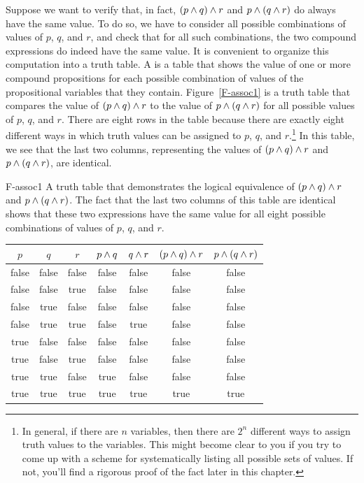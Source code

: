 Suppose we want to verify that, in fact, $(p\wedge q)\wedge r$ and
$p\wedge (q\wedge r)$ do always have the same value.  To do so,
we have to consider all possible combinations of values
of $p$, $q$, and $r$, and check that for all such combinations,
the two compound expressions do indeed have the same value.
It is convenient to organize this computation into a
truth table.  A  is a table that shows the
value of one or more compound propositions for each possible
combination of values of the propositional variables that they contain.
Figure~\ref{F-assoc1} is a truth table that compares the
value of $(p\wedge q)\wedge r$ to the value of $p\wedge (q\wedge r)$
for all possible values of $p$, $q$, and $r$.  There are
eight rows in the table because there are exactly eight different
ways in which truth values can be assigned to $p$, $q$, and
$r$.\footnote{In general, if there are $n$ variables, then
there are $2^n$ different ways to assign truth values to the
variables.  This might become clear to you if you try to come
up with a scheme for systematically listing all possible sets
of values.  If not, you'll find a rigorous proof of the fact 
later in this chapter.}  In this table, we see that the last
two columns, representing the values of
$(p\wedge q)\wedge r$ and $p\wedge (q\wedge r)$, are
identical.

\fig
  {F-assoc1}
  {A truth table that demonstrates the logical equivalence of
      $(p\wedge q)\wedge r$ and $p\wedge(q\wedge r)$.  The fact that the
      last two columns of this table are identical shows that
      these two expressions have the same value for all eight
      possible combinations of values of $p$, $q$, and $r$.}
  {\begin{tabular}{|c|c|c||c|c|c|c|}
        \hline
        $p$& $q$& $r$&
           $p\wedge q$& $q\wedge r$&
           $(p\wedge q)\wedge r$& $p\wedge (q\wedge r)$\\
        \hline
        \strut false& false& false& false& false& false& false\\
        false& false& true&  false& false& false& false\\
        false& true&  false& false& false& false& false\\
        false& true&  true&  false& true&  false& false\\
        true&  false& false& false& false& false& false\\
        true&  false& true&  false& false& false& false\\
        true&  true&  false& true&  false& false& false\\
        true&  true&  true&  true&  true&  true&  true\\
        \hline
     \end{tabular}
   }


